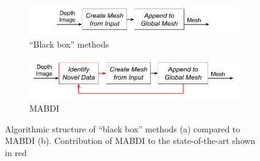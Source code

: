 \begin{figure}[h]%
\centering
\begin{subfigure}[t]{\textwidth}
  \includegraphics[width=.9\textwidth]{figures/diagram_general_pipeline_blackbox.png}
  \caption{``Black box'' methods}
  \label{fig:pipeline_blackbox}
\end{subfigure}
\begin{subfigure}[b]{\textwidth}
  \includegraphics[width=.9\textwidth]{figures/diagram_general_pipeline_mabdi.png}
  \caption{MABDI}
  \label{fig:pipeline_mabdi}
\end{subfigure}
\caption{Algorithmic structure of ``black box'' methods (a) compared to MABDI
(b). Contribution of MABDI to the state-of-the-art shown in red}
\label{fig:pipeline}
\end{figure}
